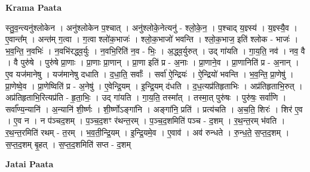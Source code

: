 \documentclass[17pt]{extarticle}
\begin{document}
\textbf{Krama Paata} \newline

स्तु॒व॒न्त्यनु॑श्लोकेन । अनु॑श्लोकेन प॒श्चात् । अनु॑श्लोके॒नेत्यनु॑ - श्लो॒के॒न॒ । प॒श्चाद् य॒ज्ञ्स्य॑ । य॒ज्ञ्स्यै॒व । ए॒वान्त᳚म् । अन्त॑म् ग॒त्वा । ग॒त्वा श्लो॑क॒भाजः॑ । श्लो॒क॒भाजो॑ भवन्ति । श्लो॒क॒भाज॒ इति॑ श्लोक - भाजः॑ । भ॒व॒न्ति॒ न॒वभिः॑ । न॒वभि॑रद्ध्व॒र्युः । न॒वभि॒रिति॑ न॒व - भिः॒ । अ॒द्ध्व॒र्युरुत् । उद् गा॑यति । गा॒य॒ति॒ नव॑ । नव॒ वै । वै पुरु॑षे । पुरु॑षे प्रा॒णाः । प्रा॒णाः प्रा॒णान् । प्रा॒णा इति॑ प्र - अ॒नाः । प्रा॒णाने॒व । प्रा॒णानिति॑ प्र - अ॒नान् । ए॒व यज॑मानेषु । यज॑मानेषु दधाति । द॒धा॒ति॒ सर्वाः᳚ । सर्वा॑ ऐ॒न्द्रियः॑ । ऐ॒न्द्रियो॑ भवन्ति । भ॒व॒न्ति॒ प्रा॒णेषु॑ । प्रा॒णेष्वे॒व । प्रा॒णेष्विति॑ प्र - अ॒नेषु॑ । ए॒वेन्द्रि॒यम् । इ॒न्द्रि॒यम् द॑धति । द॒ध॒त्यप्र॑तिहृताभिः । अप्र॑तिहृताभि॒रुत् । अप्र॑तिहृताभि॒रित्यप्र॑ति - हृ॒ता॒भिः॒ । उद् गा॑यति । गा॒य॒ति॒ तस्मा᳚त् । तस्मा॒त् पुरु॑षः । पुरु॑षः॒ सर्वा॑णि । सर्वा᳚ण्य॒न्यानि॑ । अ॒न्यानि॑ शी॒र्ष्णः । शी॒र्ष्णोऽङ्‍गा॑नि । अङ्‍गा॑नि॒ प्रति॑ । प्रत्य॑चति । अ॒च॒ति॒ शिरः॑ । शिर॑ ए॒व । ए॒व न । न प॑ञ्चद॒शम् । प॒ञ्च॒द॒शꣳ र॑थन्त॒रम् । प॒ञ्च॒द॒शमिति॑ पञ्च - द॒शम् । र॒थ॒न्त॒रम् भ॑वति । र॒थ॒न्त॒रमिति॑ रथम् - त॒रम् । भ॒व॒ती॒न्द्रि॒यम् । इ॒न्द्रि॒यमे॒व । ए॒वाव॑ । अव॑ रुन्धते । रु॒न्ध॒ते॒ स॒प्त॒द॒शम् । स॒प्त॒द॒शम् बृ॒हत् । स॒प्त॒द॒शमिति॑ सप्त - द॒शम् \newline

\textbf{Jatai Paata} \newline
\end{document}
